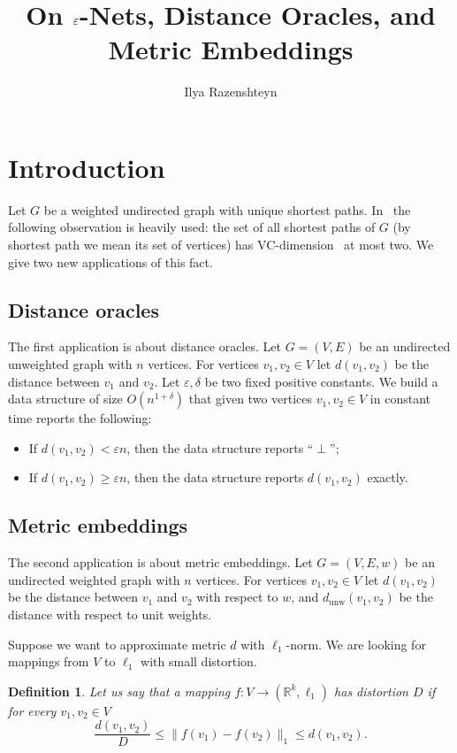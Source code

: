 \documentclass{article}
\title{On $\eps$-Nets, Distance Oracles, and Metric Embeddings}
\author{Ilya Razenshteyn}
\date{}
\newcommand{\dunw}{d_{\mathrm{unw}}}
\newcommand{\eps}{\varepsilon}
\newtheorem{definition}{Definition}
\begin{document}
    \maketitle
    \section{Introduction}

    Let $G$ be a weighted undirected graph with unique shortest paths.
    In~\cite{ADFGW11} the following observation is heavily used: the set of all shortest paths of $G$ (by shortest path we mean its set of vertices)
    has VC-dimension~\cite{VC71} at most two.
    We give two new applications of this fact.

    \subsection{Distance oracles}

    The first application is about distance oracles.
    Let $G = (V, E)$ be an undirected unweighted graph with $n$ vertices.
    For vertices $v_1, v_2 \in V$ let $d(v_1, v_2)$ be the distance between $v_1$ and $v_2$.
    Let $\eps, \delta$ be two fixed positive constants.
    We build a data structure of size $O(n^{1 + \delta})$ that given two vertices $v_1, v_2 \in V$ in constant time reports the following:
    \begin{itemize}
        \item If $d(v_1, v_2) < \eps n$, then the data structure reports ``$\perp$'';
        \item If $d(v_1, v_2) \geq \eps n$, then the data structure reports $d(v_1, v_2)$ exactly.
    \end{itemize}

    \subsection{Metric embeddings}

    The second application is about metric embeddings.
    Let $G = (V, E, w)$ be an undirected weighted graph with $n$ vertices.
    For vertices $v_1, v_2 \in V$ let $d(v_1, v_2)$ be the distance between $v_1$ and $v_2$ with respect to $w$,
    and $\dunw(v_1, v_2)$ be the distance with respect to unit weights.

    Suppose we want to approximate metric $d$ with $\ell_1$-norm. We are looking for mappings from $V$ to $\ell_1$ with small distortion. 
    \begin{definition}
        Let us say that a mapping $f \colon V \to (\mathbb{R}^k, \ell_1)$ has distortion $D$ if for every $v_1, v_2 \in V$
        $$
            \frac{d(v_1, v_2)}{D} \leq \|f(v_1) - f(v_2)\|_1 \leq d(v_1, v_2).
        $$
    \end{definition}
\end{document}
